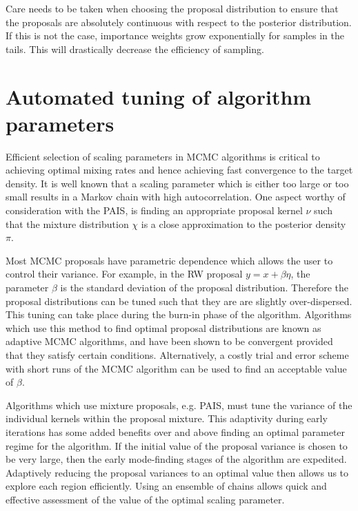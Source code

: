 \documentclass[final]{siamltex}
\begin{document}
Care needs to be taken when choosing the proposal distribution to
ensure that the proposals are absolutely continuous with respect to
the posterior distribution. If this is not the case, importance
weights grow exponentially for samples in the tails. This will
drastically decrease the efficiency of sampling.


\section{Automated tuning of algorithm parameters}\label{Sec:adapt}

Efficient selection of scaling parameters in MCMC algorithms is
critical to achieving optimal mixing rates and hence achieving fast
convergence to the target density. It is well known that a scaling
parameter which is either too large or too small results in a Markov
chain with high autocorrelation. One aspect worthy of consideration
with the PAIS, is finding an appropriate proposal kernel $\nu$ such
that the mixture distribution $\chi$ is a close approximation to the
posterior density $\pi$.

Most MCMC proposals have parametric dependence which
allows the user to control their variance. For example, in the RW
proposal $y = x + \beta \eta$, the parameter $\beta$ is the standard deviation
of the proposal distribution. Therefore the proposal distributions can
be tuned such that they are are slightly over-dispersed. This tuning
can take place during the burn-in phase of the algorithm. Algorithms
which use this method to find optimal proposal distributions are known
as adaptive MCMC algorithms, and have been shown to be convergent
provided that they satisfy certain
conditions\cite{roberts2007coupling,roberts2009examples}.
Alternatively, a costly trial and error scheme with short runs of the
MCMC algorithm can be used to find an acceptable value of $\beta$.

Algorithms which use mixture proposals, e.g. PAIS, must tune the
variance of the individual kernels within the proposal mixture. This
adaptivity during early iterations has some added benefits over and above
finding an optimal parameter regime for the algorithm. If the initial
value of the proposal variance is chosen to be very large, then the early
mode-finding stages of the algorithm are expedited. Adaptively
reducing the proposal variances to an optimal value then allows us to
explore each region efficiently. Using an ensemble of chains allows
quick and effective assessment of the value of the optimal scaling
parameter.
\end{document}
